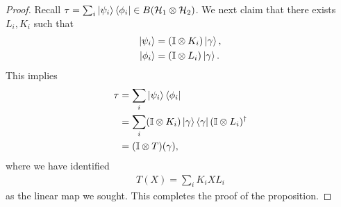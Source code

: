 \documentclass[../../note.tex]{subfiles}
\begin{document}
\begin{tcolorbox}[colframe=black,breakable, colback=black!5, arc=0pt, outer arc=0pt,boxrule=0.5pt]
\begin{proof}
Recall $\tau = \sum_i \ket{\psi_i}\bra{\phi_i} \in B(\mathcal{H}_1 \otimes \mathcal{H}_2)$. We next claim that there exists $L_i, K_i$ such that 
\begin{align}
    \ket{\psi_i}&=(\mathbb{I}\otimes K_i)\ket{\gamma},\\
    \ket{\phi_i}&=(\mathbb{I}\otimes L_i)\ket{\gamma}.\\
\end{align}
This implies
\begin{align}
    \tau &= \sum_i \ket{\psi_i}\bra{\phi_i} \\
    &=\sum_i (\mathbb{I}\otimes K_i) \ket{\gamma}\bra{\gamma}(\mathbb{I}\otimes L_i)^{\dagger} \\
    &= (\mathbb{I} \otimes T)(\gamma),
\end{align}
where we have identified 
\begin{align}
    T(X)=\sum_i K_i X L_i
\end{align}
as the linear map we sought. This completes the proof of the proposition. 
\end{proof}
\end{tcolorbox}
\end{document}
